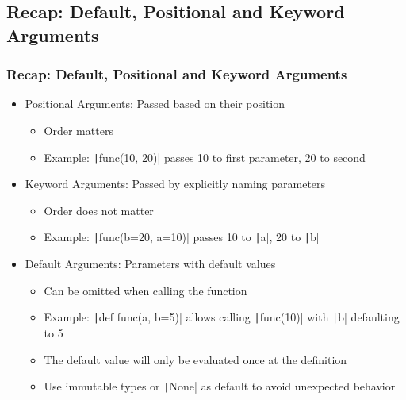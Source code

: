 \documentclass{beamer}
\newcommand{\python}[1]{\texttt|#1|}
\begin{document}
\subsection{Recap: Default, Positional and Keyword Arguments}
\begin{frame}
    \frametitle{Recap: Default, Positional and Keyword Arguments}
    \begin{itemize}
        \item Positional Arguments: Passed based on their position
              \begin{itemize}
                  \item Order matters
                  \item Example: \python{func(10, 20)} passes 10 to first parameter, 20 to second
              \end{itemize}
        \item Keyword Arguments: Passed by explicitly naming parameters
              \begin{itemize}
                  \item Order does not matter
                  \item Example: \python{func(b=20, a=10)} passes 10 to \python{a}, 20 to \python{b}
              \end{itemize}
        \item Default Arguments: Parameters with default values
              \begin{itemize}
                  \item Can be omitted when calling the function
                  \item Example: \python{def func(a, b=5)} allows calling \python{func(10)} with \python{b} defaulting to 5
                  \item The default value will only be evaluated once at the definition
                  \item Use immutable types or \python{None} as default to avoid unexpected behavior
              \end{itemize}
    \end{itemize}
\end{frame}
\end{document}
